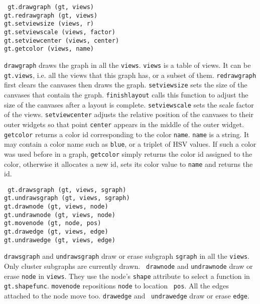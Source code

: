\begin{flushleft}\tt
gt.drawgraph (gt, views)\\
gt.redrawgraph (gt, views)\\
gt.setviewsize (views, r)\\
gt.setviewscale (views, factor)\\
gt.setviewcenter (views, center)\\
gt.getcolor (views, name)\\
\end{flushleft}\vspace{-2\itemsep}
{\tt drawgraph} draws the graph in all the {\tt views}. {\tt views} is a table
of views. It can be {\tt gt.views}, i.e. all the views that this graph has, or
a subset of them. {\tt redrawgraph} first clears the canvases then draws the
graph. {\tt setviewsize} sets the size of the canvases that contain the
graph. {\tt finishlayout} calls this function to adjust the size of the
canvases after a layout is complete. {\tt setviewscale} sets the scale factor
of the views.  {\tt setviewcenter} adjusts the relative position of the
canvases to their outer widgets so that point {\tt center} appears in the
middle of the outer widget. {\tt getcolor} returns a color id corresponding to
the color {\tt name}. {\tt name} is a string. It may contain a color name such
as {\tt blue}, or a triplet of HSV values.  If such a color was used before in
a graph, {\tt getcolor} simply returns the color id assigned to the color,
otherwise it allocates a new id, sets its color value to {\tt name} and returns
the id.

\begin{flushleft}\tt
gt.drawsgraph (gt, views, sgraph)\\
gt.undrawsgraph (gt, views, sgraph)\\
gt.drawnode (gt, views, node)\\
gt.undrawnode (gt, views, node)\\
gt.movenode (gt, node, pos)\\
gt.drawedge (gt, views, edge)\\
gt.undrawedge (gt, views, edge)\\
\end{flushleft}\vspace{-2\itemsep}
{\tt drawsgraph} and {\tt undrawsgraph} draw or erase subgraph {\tt sgraph} in
all the {\tt views}.  Only cluster subgraphs are currently drawn. {\tt
drawnode} and {\tt undrawnode} draw or erase {\tt node} in {\tt views}. They
use the node's {\tt shape} attribute to select a function in {\tt
gt.shapefunc}.  {\tt movenode} repositions {\tt node} to location {\tt
pos}. All the edges attached to the node move too. {\tt drawedge} and {\tt
undrawedge} draw or erase {\tt edge}.

